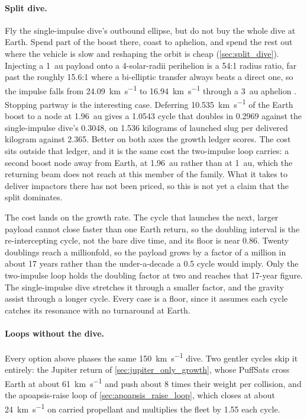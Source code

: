 \documentclass{article}
\begin{document}
\paragraph{Split dive.} Fly the single-impulse dive's outbound ellipse, but do not buy the whole dive at Earth. Spend part of the boost there, coast to aphelion, and spend the rest out where the vehicle is slow and reshaping the orbit is cheap (\autoref{sec:split_dive}). Injecting a \SI{1}{\astronomicalunit} payload onto a 4-solar-radii perihelion is a 54:1 radius ratio, far past the roughly 15.6:1 where a bi-elliptic transfer always beats a direct one, so the impulse falls from \SI{24.09}{\kilo\meter\per\second} to \SI{16.94}{\kilo\meter\per\second} through a \SI{3}{\astronomicalunit} aphelion \cite{Katz_aim_is_all_you_need_2025}. Stopping partway is the interesting case. Deferring \SI{10.535}{\kilo\meter\per\second} of the Earth boost to a node at \SI{1.96}{\astronomicalunit} gives a \SI{1.0543}{\year} cycle that doubles in \SI{0.2969}{\year} against the single-impulse dive's \SI{0.3048}{\year}, on \num{1.536} kilograms of launched slug per delivered kilogram against \num{2.365}. Better on both axes the growth ledger scores. The cost sits outside that ledger, and it is the same cost the two-impulse loop carries: a second boost node away from Earth, at \SI{1.96}{\astronomicalunit} rather than at \SI{1}{\astronomicalunit}, which the returning beam does not reach at this member of the family. What it takes to deliver impactors there has not been priced, so this is not yet a claim that the split dominates.

The cost lands on the growth rate. The cycle that launches the next, larger payload cannot close faster than one Earth return, so the doubling interval is the re-intercepting cycle, not the bare dive time, and its floor is near \SI{0.86}{\year}. Twenty doublings reach a millionfold, so the payload grows by a factor of a million in about 17 years rather than the under-a-decade a \SI{0.5}{\year} cycle would imply. Only the two-impulse loop holds the doubling factor at two and reaches that 17-year figure. The single-impulse dive stretches it through a smaller factor, and the gravity assist through a longer cycle. Every case is a floor, since it assumes each cycle catches its resonance with no turnaround at Earth.

\paragraph{Loops without the dive.} Every option above phases the same \SI{150}{\kilo\meter\per\second} dive. Two gentler cycles skip it entirely: the Jupiter return of \autoref{sec:jupiter_only_growth}, whose PuffSats cross Earth at about \SI{61}{\kilo\meter\per\second} and push about 8 times their weight per collision, and the apoapsis-raise loop of \autoref{sec:apoapsis_raise_loop}, which closes at about \SI{24}{\kilo\meter\per\second} on carried propellant and multiplies the fleet by 1.55 each cycle.
\end{document}

